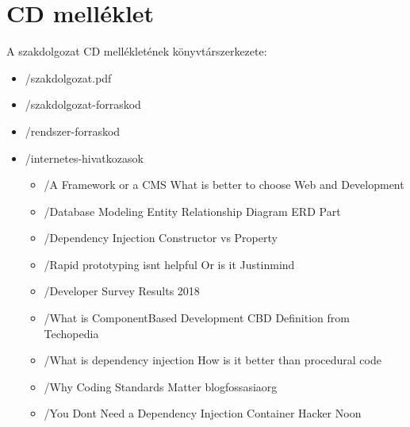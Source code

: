 \documentclass[a4paper,12pt,oneside]{report}
\begin{document}
\newpage

\sectionfont{\rmfamily\bfseries\large}
\thispagestyle{empty}
\section{CD melléklet}

A szakdolgozat CD mellékletének könyvtárszerkezete:

\begin{itemize}
	\item[] /szakdolgozat.pdf
	\item[] /szakdolgozat-forraskod
	\item[] /rendszer-forraskod
	\item[] /internetes-hivatkozasok
		\begin{itemize}
            \item[] /A Framework or a CMS What is better to choose Web and Development
            \item[] /Database Modeling Entity Relationship Diagram ERD Part 
            \item[] /Dependency Injection Constructor vs Property
            \item[] /Rapid prototyping isnt helpful Or is it Justinmind
            \item[] /Developer Survey Results 2018 
            \item[] /What is ComponentBased Development CBD Definition from Techopedia
            \item[] /What is dependency injection How is it better than procedural code
            \item[] /Why Coding Standards Matter blogfossasiaorg
            \item[] /You Dont Need a Dependency Injection Container Hacker Noon
		\end{itemize}
\end{itemize}
\end{document}
